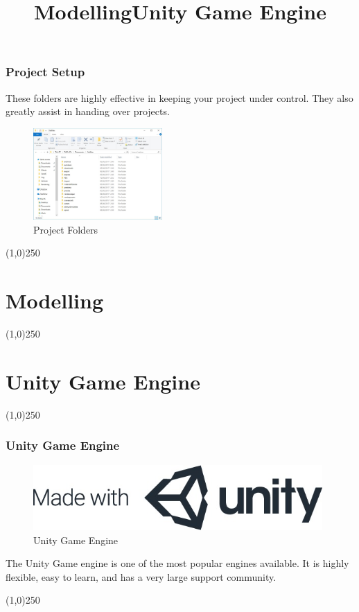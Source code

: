 \begin{frame}
\frametitle{Project Setup}
These folders are highly effective in keeping your project under control.  They also greatly assist in handing over projects.
\begin{figure}
	\centering
	\includegraphics[height=3.5cm]{img/ProjectFolders}
	\caption[Project Folders]{Project Folders}
	\label{fig:projectFolders}
\end{figure}
\end{frame}
\begin{center}\line(1,0){250}\end{center}








\section{Modelling}
\begin{frame}
	\title[Modelling]{Modelling}
	\titlepage
\end{frame}\begin{center}\line(1,0){250}\end{center}







\section{Unity Game Engine}
\begin{frame}
\title[Modelling]{Unity Game Engine}
\titlepage
\end{frame}\begin{center}\line(1,0){250}\end{center}


\begin{frame}
\frametitle{Unity Game Engine}
\begin{figure}
	\centering
	\includegraphics[height=2.5cm]{./img/Unity/mwu-logo.jpg}
	\caption[Unity Game Engine]{Unity Game Engine}
	\label{fig:mwulogo}
\end{figure}
The Unity Game engine is one of the most popular engines available.  It is highly flexible, easy to learn, and has a very large support community.
\end{frame}
\begin{center}\line(1,0){250}\end{center}



